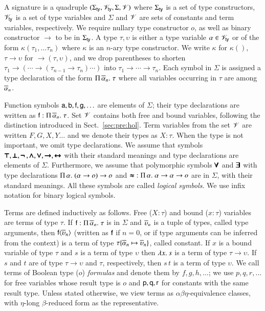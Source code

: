 A signature is a quadruple $(\Sigma_\mathsf{ty}, \mathscr{V}_\mathsf{ty}, \Sigma, \mathscr{V})$ where $\Sigma_\mathsf{ty}$ is a
set of type constructors, $\mathscr{V}_\mathsf{ty}$ is a set of type variables and $\Sigma$ and
$\mathscr{V}$ are sets of constants and term variables, respectively. We require nullary
type constructor $o$, as well as binary constructor $\rightarrow$
to be in $\Sigma_\mathsf{ty}$. A type $\tau, \upsilon$ is either a type variable $\alpha \in
\mathscr{V}_\mathsf{ty}$ or of the form $\kappa(\tau_1, \ldots \tau_n)$ where $\kappa$ is an
$n$-ary type constructor. We write $\kappa$ for $\kappa()$, $\tau \rightarrow
\upsilon$ for $\rightarrow(\tau, \upsilon)$, and we drop parentheses to shorten 
$\tau_1 \rightarrow (\cdots \rightarrow (\tau_{n-1} \rightarrow \tau_n) \cdots)$ into $\tau_1 \rightarrow \cdots \rightarrow
\tau_n$. Each symbol in $\Sigma$ is
assigned a type declaration of the form $\Pi\,\overline{\alpha}_{n}.\; \tau$ where all variables
occurring in $\tau$ are among $\overline{\alpha}_{n}$.

Function symbols $\mathsf{a}, \mathsf{b}, \mathsf{f}, \mathsf{g}, \ldots$ are elements of
$\Sigma$; their type declarations are written as $\mathsf{f} :
\Pi\,\overline{\alpha}_{n}.\; \tau$. Set $\mathscr{V}$ contains both free and bound variables, following
the distinction introduced in Sect.~\ref{sec:pre:hol}. Term variables from the set $\mathscr{V}$ are written
$F,G,X,Y \ldots$ and we denote their types as $X : \tau$. When the type is not
important, we omit type declarations. We assume that symbols $\pmb\top,
\pmb\bot,\pmb{\neg\,},\pmb\land, \pmb\lor,\pmb\rightarrow,\pmb\leftrightarrow$ with their standard meanings and type declarations are elements of
$\Sigma$. Furthermore, we assume that polymorphic symbols $\pmb\forall$ and $\pmb\exists$
with type declarations $\Pi\,\alpha.\; (\alpha \rightarrow o) \rightarrow o$
and $\pmb\approx \; : \Pi\,\alpha.\; {\alpha \rightarrow \alpha \rightarrow o}$ are
in $\Sigma$, with their standard meanings. All these symbols are called \emph{logical
symbols}. We use infix notation for binary logical symbols.

 Terms are defined inductively as follows. Free ($X : \tau$)  and bound ($x : \tau$) variables   are
terms of type $\tau$. If $\mathsf{f} : \Pi\,\overline{\alpha}_{n}.\; \tau$ is in
$\Sigma$ and $\overline{\upsilon}_{n}$ is a tuple of types, called type arguments, then
$\mathsf{f}{\langle\overline{\upsilon}_{n}\rangle}$ (written as $\mathsf{f}$ if $n=0$, or if type
arguments can be inferred from the context) is a term of type $\tau \{
\overline{\alpha}_{n} \mapsto \overline{\upsilon}_{n} \}$, called constant. If $x$ is a bound variable
of type $\tau$ and $s$ is a term of type $\upsilon$ then $\lambda x.\> s$ is a term of type
$\tau \rightarrow \upsilon$. If $s$ and $t$ are of type $\tau \rightarrow \upsilon$ and
$\tau$, respectively, then $s \, t$ is a term of type $\upsilon$. We call terms of
Boolean type ($o$) \emph{formulas} and denote them by $f,g,h, \ldots$; we use
$p,q,r, \ldots$ for free variables whose result type is $o$ and
$\mathsf{p},\mathsf{q},\mathsf{r}$ for constants with the same result type.
%
Unless stated otherwise, we view terms as
$\alpha\beta\eta$-equivalence classes, with $\eta$-long $\beta$-reduced form as
the representative. 

